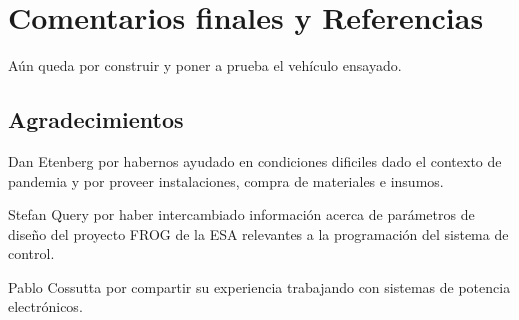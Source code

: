\documentclass[11pt, titlepage]{article}
\begin{document}


\null\newpage
\clearpage



\null\newpage
\clearpage




\null\newpage
\clearpage



\null\newpage
\clearpage



\null\newpage
\clearpage



\null\newpage
\clearpage





\section{Comentarios finales y Referencias}
Aún queda por construir y poner a prueba el vehículo ensayado.

\subsection*{Agradecimientos}
Dan Etenberg por habernos ayudado en condiciones dificiles dado el contexto de pandemia y por proveer instalaciones, compra de materiales e insumos. 

\medskip

Stefan Query por haber intercambiado información acerca de parámetros de diseño del proyecto FROG de la ESA relevantes a la programación del sistema de control.

\medskip

Pablo Cossutta por compartir su experiencia trabajando con sistemas de potencia electrónicos. 



% 
%

\null\newpage
\clearpage


\end{document}
